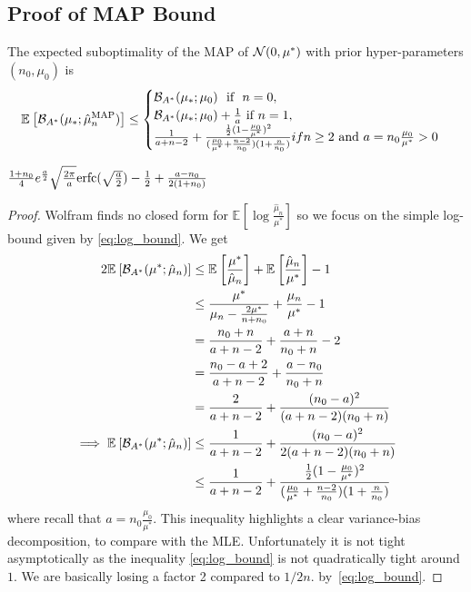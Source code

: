 \documentclass{article}
\newcommand*{\expect}[2][]{\ensuremath{\mathbb{E}_{#1} \left[ #2 \right] }} %
\newcommand{\logpart}{A}
\newcommand{\bregmanconj}{\cB_{\logpart^*}}
\newcommand{\MAPm}{\hat \mu_n}
\begin{document}
\subsection{Proof of MAP Bound}
\begin{theorem}
 The expected suboptimality of the MAP of $\cN(0,\mu^*)$ with prior hyper-parameters $(n_0,\mu_0)$ is 
\begin{equation}
	\expect{\bregmanconj( \mu_*; \hat \mu_n^\text{MAP})}
	\leq \begin{cases}
		\bregmanconj( \mu_*; \mu_0) \ \text{ if } \ n=0, \\
		\bregmanconj( \mu_*; \mu_0) +\inv{a} \ \text{if}\ n=1,\\
		\frac{1}{a+n-2} + \frac{\half(1 - \frac{\mu_0}{\mu^*})^2}{(\frac{\mu_0}{\mu^*}+\frac{n-2}{n_0})(1 + \frac{n}{n_0} )} if n\geq 2 \ \text{and}\ a=n_0 \frac{\mu_0}{\mu^*} >0
	\end{cases}
\end{equation}
\end{theorem}

$\frac{1+n_0}{4} e^{\half[a]} \sqrt{\frac{2 \pi}{a}} \mathrm{erfc}(\sqrt{\half[a]})  - \half  + \frac{a - n_0}{2(1+n_0)} $

\begin{proof}
		Wolfram finds no closed form for $\expect{\log\frac{\MAPm}{\mu^*}}$ so we focus on the simple log-bound given by \eqref{eq:log_bound}. We get
\begin{align}
	2\expect{\bregmanconj(\mu^*; \MAPm)} 
	&\leq \expect{\frac{\mu^*}{\MAPm}}  + \expect{\frac{\MAPm}{\mu^*}} - 1 \\
	&\leq \frac{\mu^*}{\mu_n - \frac{2 \mu^*}{n + n_0}}   + \frac{\mu_n}{\mu^*} - 1 \\
	&= \frac{n_0 + n}{a +n - 2} + \frac{a+n}{n_0 + n} - 2 \\
	&= \frac{n_0 - a + 2}{a +n - 2} + \frac{a - n_0}{n_0 + n} \\
	&= \frac{2}{a+n-2} + \frac{(n_0 - a)^2}{(a+n-2)(n_0 + n)} \\
	\implies \expect{\bregmanconj(\mu^*; \MAPm)} 
	&\leq \frac{1}{a+n-2} + \frac{(n_0 - a)^2}{2(a+n-2)(n_0 + n)} \\
	&\leq \frac{1}{a+n-2} + \frac{\half(1 - \frac{\mu_0}{\mu^*})^2}{(\frac{\mu_0}{\mu^*}+\frac{n-2}{n_0})(1 + \frac{n}{n_0} )} 
\end{align}
where recall that $a=n_0\frac{\mu_0}{\mu^*}$. 
This inequality highlights a clear variance-bias decomposition, to compare with the MLE. Unfortunately it is not tight asymptotically as the inequality \eqref{eq:log_bound} is not quadratically tight around $1$. We are basically losing a factor 2 compared to $1/2n$. by~\eqref{eq:log_bound}.
\end{proof}
\end{document}
